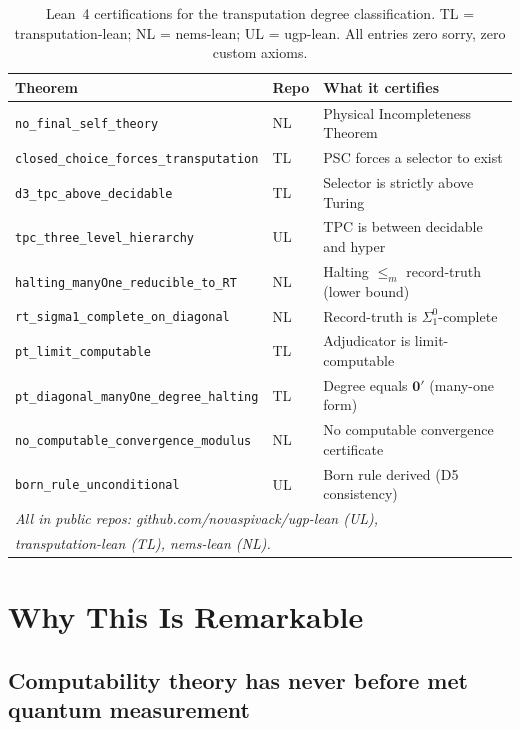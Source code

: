 \documentclass[11pt,a4paper]{article}
\newcommand{\lean}[1]{\texttt{#1}}
\newcommand{\zerp}{\mathbf{0}'}
\begin{document}
\begin{table}[h]
\centering
\small
\caption{Lean~4 certifications for the transputation degree classification.
TL = transputation-lean; NL = nems-lean; UL = ugp-lean.
All entries zero sorry, zero custom axioms.}
\label{tab:lean}
\begin{tabular}{@{}lll@{}}
\toprule
\textbf{Theorem} & \textbf{Repo} & \textbf{What it certifies} \\
\midrule
\lean{no\_final\_self\_theory} & NL & Physical Incompleteness Theorem \\
\lean{closed\_choice\_forces\_transputation} & TL & PSC forces a selector to exist \\
\lean{d3\_tpc\_above\_decidable} & TL & Selector is strictly above Turing \\
\lean{tpc\_three\_level\_hierarchy} & UL & TPC is between decidable and hyper \\
\lean{halting\_manyOne\_reducible\_to\_RT} & NL & Halting $\leq_m$ record-truth (lower bound) \\
\lean{rt\_sigma1\_complete\_on\_diagonal} & NL & Record-truth is $\Sigma^0_1$-complete \\
\lean{pt\_limit\_computable} & TL & Adjudicator is limit-computable \\
\lean{pt\_diagonal\_manyOne\_degree\_halting} & TL & Degree equals $\zerp$ (many-one form) \\
\lean{no\_computable\_convergence\_modulus} & NL & No computable convergence certificate \\
\lean{born\_rule\_unconditional} & UL & Born rule derived (D5 consistency) \\
\midrule
\multicolumn{3}{l}{\small\textit{All in public repos: github.com/novaspivack/ugp-lean (UL),}} \\
\multicolumn{3}{l}{\small\textit{transputation-lean (TL), nems-lean (NL).}} \\
\bottomrule
\end{tabular}
\end{table}

\section{Why This Is Remarkable}
\label{sec:remarkable}

\subsection{Computability theory has never before met quantum measurement}
\end{document}

